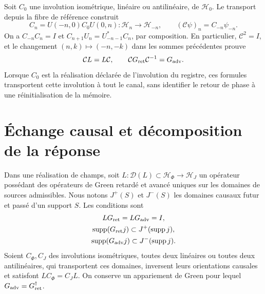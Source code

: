 Soit \(C_0\) une involution isométrique, linéaire ou antilinéaire, de \(\mathcal H_0\). Le transport depuis la fibre de référence construit
\[
 C_n=U(-n,0)C_0U(0,n):\mathcal H_n\longrightarrow\mathcal H_{-n},
 \qquad (\mathcal C\psi)_n=C_{-n}\psi_{-n}.
\]
On a \(C_{-n}C_n=I\) et \(C_{n+1}U_n=U_{-n-1}^*C_n\), par composition. En particulier, \(\mathcal C^2=I\), et le changement \((n,k)\mapsto(-n,-k)\) dans les sommes précédentes prouve
\begin{equation}
 \mathcal C L=L\mathcal C,\qquad
 \mathcal C G_{\rm ret}\mathcal C^{-1}=G_{\rm adv}.
 \label{x_reciprocidad:vii:eq:intercambio-green-cronologico}
\end{equation}
Lorsque \(C_0\) est la réalisation déclarée de l'involution du registre, ces formules transportent cette involution à tout le canal, sans identifier le retour de phase à une réinitialisation de la mémoire.

\section{Échange causal et décomposition de la réponse}
\label{x_reciprocidad:vii:subsec:green-realizacion-campos}

Dans une réalisation de champs, soit
\(L:\mathcal D(L)\subset\mathcal H_\Phi\to\mathcal H_J\)
un opérateur possédant des opérateurs de Green retardé et avancé uniques sur les domaines de
sources admissibles. Nous notons \(J^+(S)\) et \(J^-(S)\) les
domaines causaux futur et passé d'un support \(S\). Les conditions sont
\[
 \begin{gathered}
 LG_{\rm ret}=LG_{\rm adv}=I,\\
 \operatorname{supp}(G_{\rm ret}j)\subset J^+(\operatorname{supp}j),\\
 \operatorname{supp}(G_{\rm adv}j)\subset J^-(\operatorname{supp}j).
 \end{gathered}
\]
Soient \(C_\Phi,C_J\) des involutions isométriques, toutes deux linéaires ou toutes deux
antilinéaires, qui transportent ces domaines,
inversent leurs orientations causales et satisfont
\(LC_\Phi=C_JL\). On conserve un appariement de Green pour lequel
\(G_{\rm adv}=G_{\rm ret}^{\dagger}\).

